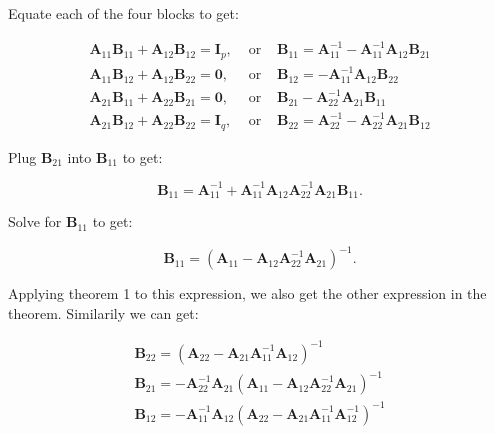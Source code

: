 \documentclass[10pt,b5paper,titlepage]{book}
\begin{document}
\begin{itemize}
        Equate each of the four blocks to get:

        \begin{equation}
            \begin{array}{lcl}
                \mathbf{A}_{11} \mathbf{B}_{11} + \mathbf{A}_{12} \mathbf{B}_{12} = \mathbf{I}_{p}, & \text{ or } & \mathbf{B}_{11} = \mathbf{A}_{11}^{-1} - \mathbf{A}_{11}^{-1} \mathbf{A}_{12} \mathbf{B}_{21} \\
                \mathbf{A}_{11} \mathbf{B}_{12} + \mathbf{A}_{12} \mathbf{B}_{22} = \mathbf{0}, & \text{ or } & \mathbf{B}_{12} = - \mathbf{A}_{11}^{-1} \mathbf{A}_{12} \mathbf{B}_{22} \\
                \mathbf{A}_{21} \mathbf{B}_{11} + \mathbf{A}_{22} \mathbf{B}_{21} = \mathbf{0}, & \text{ or } & \mathbf{B}_{21} - \mathbf{A}_{22}^{-1} \mathbf{A}_{21} \mathbf{B}_{11} \\
                \mathbf{A}_{21} \mathbf{B}_{12} + \mathbf{A}_{22} \mathbf{B}_{22} = \mathbf{I}_{q}, & \text{ or } & \mathbf{B}_{22} = \mathbf{A}_{22}^{-1} - \mathbf{A}_{22}^{-1} \mathbf{A}_{21} \mathbf{B}_{12}
            \end{array}
        \end{equation}

        Plug $\mathbf{B}_{21}$ into $\mathbf{B}_{11}$ to get:

        \begin{equation}
            \mathbf{B}_{11} = \mathbf{A}_{11}^{-1} + \mathbf{A}_{11}^{-1} \mathbf{A}_{12} \mathbf{A}_{22}^{-1} \mathbf{A}_{21} \mathbf{B}_{11}
        .\end{equation}

        Solve for $\mathbf{B}_{11}$ to get:

        \begin{equation}
            \mathbf{B}_{11} = (\mathbf{A}_{11} - \mathbf{A}_{12} \mathbf{A}_{22}^{-1} \mathbf{A}_{21})^{-1}
        .\end{equation}

        Applying theorem 1 to this expression, we also get the other expression in the theorem.
        Similarily we can get:

        \begin{equation}
            \begin{array}{ll}
                \mathbf{B}_{22} = (\mathbf{A}_{22} - \mathbf{A}_{21} \mathbf{A}_{11}^{-1} \mathbf{A}_{12})^{-1} \\
                \mathbf{B}_{21} = - \mathbf{A}_{22}^{-1} \mathbf{A}_{21} (\mathbf{A}_{11} - \mathbf{A}_{12} \mathbf{A}_{22}^{-1} \mathbf{A}_{21})^{-1} \\
                \mathbf{B}_{12} = - \mathbf{A}_{11}^{-1} \mathbf{A}_{12} (\mathbf{A}_{22} - \mathbf{A}_{21} \mathbf{A}_{11}^{-1} \mathbf{A}_{12}^{-1})^{-1}
            \end{array}
        \end{equation}


\end{itemize}
\end{document}
